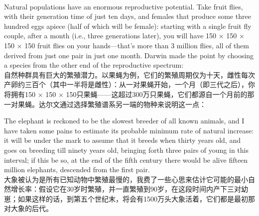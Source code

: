 \documentclass{article}
\begin{document}
\\
Natural populations have an enormous reproductive potential. Take fruit flies, with their generation time of just ten days, and females that produce some three hundred eggs apiece (half of which will be female): starting with a single fruit fly couple, after a month (i.e., three generations later), you will have 150 × 150 × 150 × 150 fruit flies on your hands—that’s more than 3 million flies, all of them derived from just one pair in just one month. Darwin made the point by choosing a species from the other end of the reproductive spectrum:\\
自然种群具有巨大的繁殖潜力。以果蝇为例，它们的繁殖周期仅为十天，雌性每次产卵约三百个（其中一半将是雌性）：从一对果蝇开始，一个月（即三代之后），你将拥有150 × 150 × 150只果蝇——这超过300万只果蝇，它们都源自一个月前的那一对果蝇。达尔文通过选择繁殖谱系另一端的物种来说明这一点：\\

\addtolength{\leftskip}{1cm}

The elephant is reckoned to be the slowest breeder of all known animals, and I have taken some pains to estimate its probable minimum rate of natural increase: it will be under the mark to assume that it breeds when thirty years old, and goes on breeding till ninety years old, bringing forth three pairs of young in this interval; if this be so, at the end of the fifth century there would be alive fifteen million elephants, descended from the first pair.\\
大象被认为是所有已知动物中繁殖最慢的，我费了一些心思来估计它可能的最小自然增长率：假设它在30岁时繁殖，并一直繁殖到90岁，在这段时间内产下三对幼崽；如果这样的话，到第五个世纪末，将会有1500万头大象活着，它们都是最初那对大象的后代。\\

\addtolength{\leftskip}{-1cm}
\end{document}

